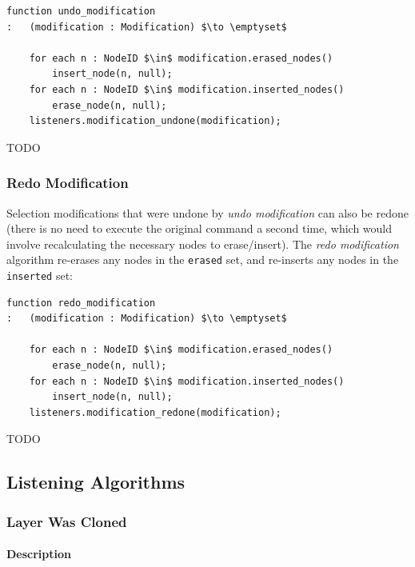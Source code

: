 \begin{lstlisting}[style=Default]
function undo_modification
:	(modification : Modification) $\to \emptyset$

	for each n : NodeID $\in$ modification.erased_nodes()
		insert_node(n, null);
	for each n : NodeID $\in$ modification.inserted_nodes()
		erase_node(n, null);
	listeners.modification_undone(modification);
\end{lstlisting}

\noindent TODO

\subsubsection{Redo Modification}

Selection modifications that were undone by \emph{undo modification} can also be redone (there is no need to execute the original command a second time, which would involve recalculating the necessary nodes to erase/insert). The \emph{redo modification} algorithm re-erases any nodes in the \texttt{erased} set, and re-inserts any nodes in the \texttt{inserted} set:

\begin{lstlisting}[style=Default]
function redo_modification
:	(modification : Modification) $\to \emptyset$

	for each n : NodeID $\in$ modification.erased_nodes()
		erase_node(n, null);
	for each n : NodeID $\in$ modification.inserted_nodes()
		insert_node(n, null);
	listeners.modification_redone(modification);
\end{lstlisting}

\noindent TODO

\newpage

\subsection{Listening Algorithms}

\subsubsection{Layer Was Cloned}

\paragraph{Description}

